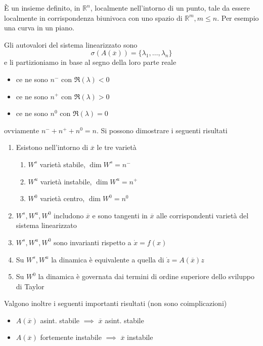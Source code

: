È un insieme definito, in $\mathbb{R}^n$, localmente nell'intorno di un punto, tale da essere localmente in corrispondenza biunivoca con uno spazio di $\mathbb{R}^m ,m\leq n$. Per esempio una curva in un piano.

Gli autovalori del sistema linearizzato sono
\begin{equation*}
	\sigma (A(\overline{x})) =\{\lambda _1 ,\dotsc ,\lambda _n\}
\end{equation*}
e li partizioniamo in base al segno della loro parte reale
\begin{itemize}
	\item ce ne sono $n^{-}$ con $\Re(\lambda) < 0$
	\item ce ne sono $n^{+}$ con $\Re(\lambda)  >0$
	\item ce ne sono $n^0$ con $\Re(\lambda) =0$
\end{itemize}

ovviamente $n^{-} +n^{+} +n^0 =n$. Si possono dimostrare i seguenti risultati
\begin{enumerate}
	\item Esistono nell'intorno di $\overline{x}$ le tre varietà
	      \begin{enumerate}
	      	\item $W^s$ varietà stabile, $\dim W^s =n^{-}$
	      	\item $W^u$ varietà instabile, $\dim W^u =n^{+}$
	      	\item $W^0$ varietà centro, $\dim W^0 =n^0$
	      \end{enumerate}
	\item $W^s ,W^u ,W^0$ includono $\overline{x}$ e sono tangenti in $\overline{x}$ alle corrispondenti varietà del sistema linearizzato
	\item $W^s ,W^u ,W^0$ sono invarianti rispetto a $\dot{x} =f(x)$
	\item Su $W^s ,W^u$ la dinamica è equivalente a quella di $\dot{z} =A(\overline{x}) z$
	\item Su $W^0$ la dinamica è governata dai termini di ordine superiore dello sviluppo di Taylor
\end{enumerate}

Valgono inoltre i seguenti importanti risultati (non sono coimplicazioni)
\begin{itemize}
	\item $A(\overline{x})$ asint. stabile $\implies $ $\overline{x}$ asint. stabile
	\item $A(\overline{x})$ fortemente instabile $\implies $ $\overline{x}$ instabile
\end{itemize}

